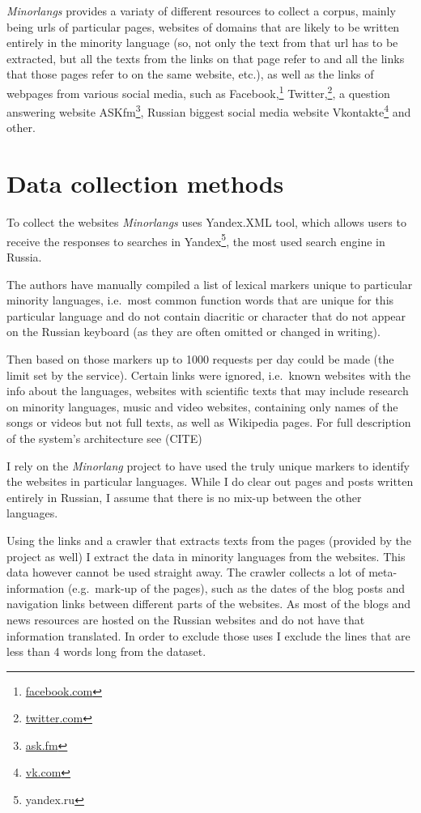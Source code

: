 \textit{Minorlangs} provides a variaty of different resources to collect a corpus, mainly being urls of particular pages, websites of domains that are likely to be written entirely in the minority language (so, not only the text from that url has to be extracted, but all the texts from the links on that page refer to and all the links that those pages refer to on the same website, etc.), as well as the links of webpages from various social media, such as Facebook,\footnote{\url{facebook.com}} Twitter,\footnote{\url{twitter.com}}, a question answering website ASKfm\footnote{\url{ask.fm}}, Russian biggest social media website Vkontakte\footnote{\url{vk.com}} and other.


\section{Data collection methods}
To collect the websites \textit{Minorlangs} uses Yandex.XML tool, which allows users to receive the responses to searches in Yandex\footnote{yandex.ru}, the most used search engine in Russia.

The authors have manually compiled a list of lexical markers unique to particular minority languages, i.e.\ most common function words that are unique for this particular language and do not contain diacritic or character that do not appear on the Russian keyboard (as they are often omitted or changed in writing).

Then based on those markers up to 1000 requests per day could be made (the limit set by the service). Certain links were ignored, i.e.\ known websites with the info about the languages, websites with scientific texts that may include research on minority languages, music and video websites, containing only names of the songs or videos but not full texts, as well as Wikipedia pages. For full description of the system's architecture see (CITE)


I rely on the \textit{Minorlang} project to have used the truly unique markers to identify the websites in particular languages. While I do clear out pages and posts written entirely in Russian, I assume that there is no mix-up between the other languages.

Using the links and a crawler that extracts texts from the pages (provided by the project as well) I extract the data in minority languages from the websites. This data however cannot be used straight away. The crawler collects a lot of meta-information (e.g.\ mark-up of the pages), such as the dates of the blog posts and navigation links between different parts of the websites. As most of the blogs and news resources are hosted on the Russian websites and do not have that information translated. In order to exclude those uses I exclude the lines that are less than 4 words long from the dataset.

